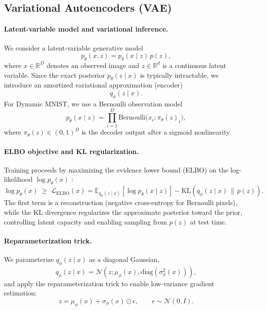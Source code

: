 
\subsection{Variational Autoencoders (VAE)}
\paragraph{Latent-variable model and variational inference.}
We consider a latent-variable generative model
\[
p_\theta(x,z)=p_\theta(x\mid z)\,p(z),
\]
where $x\in\mathbb{R}^{D}$ denotes an observed image and $z\in\mathbb{R}^{d}$ is a continuous latent variable. Since the exact posterior $p_\theta(z\mid x)$ is typically intractable, we introduce an amortized variational approximation (encoder)
\[
q_\phi(z\mid x).
\]
For Dynamic MNIST, we use a Bernoulli observation model
\[
p_\theta(x\mid z)=\prod_{i=1}^D \mathrm{Bernoulli}\bigl(x_i; \pi_\theta(z)_i\bigr),
\]
where $\pi_\theta(z)\in(0,1)^D$ is the decoder output after a sigmoid nonlinearity.

\paragraph{ELBO objective and KL regularization.}
Training proceeds by maximizing the evidence lower bound (ELBO) on the log-likelihood $\log p_\theta(x)$ \citep{kingma2014vae,rezende2014stochastic}:
\[
\log p_\theta(x)\;\ge\;\mathcal{L}_{\mathrm{ELBO}}(x)
=
\mathbb{E}_{q_\phi(z\mid x)}\left[\log p_\theta(x\mid z)\right]
-
\mathrm{KL}\!\left(q_\phi(z\mid x)\,\|\,p(z)\right).
\]
The first term is a reconstruction (negative cross-entropy for Bernoulli pixels), while the KL divergence regularizes the approximate posterior toward the prior, controlling latent capacity and enabling sampling from $p(z)$ at test time.

\paragraph{Reparameterization trick.}
We parameterize $q_\phi(z\mid x)$ as a diagonal Gaussian,
\[
q_\phi(z\mid x)=\mathcal{N}\!\left(z;\mu_\phi(x),\mathrm{diag}(\sigma_\phi^2(x))\right),
\]
and apply the reparameterization trick to enable low-variance gradient estimation:
\[
z=\mu_\phi(x)+\sigma_\phi(x)\odot\epsilon,\qquad \epsilon\sim\mathcal{N}(0,I).
\]


